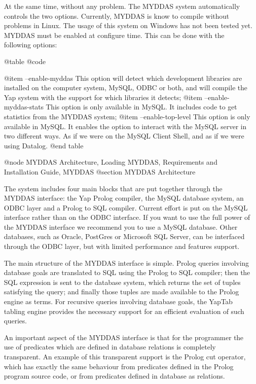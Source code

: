 {{{{{{{{{At the same time, without any problem. The MYDDAS system automatically
controls the two options. Currently, MYDDAS is know to compile without
problems in Linux. The usage of this system on Windows has not been
tested yet.  MYDDAS must be enabled at configure time. This can be done
with the following options: 

@table @code

@item --enable-myddas
 This option will detect which development libraries are installed on the computer system, MySQL, ODBC or both, and will compile the Yap system with the support for which libraries it detects;
@item  --enable-myddas-stats
This option is only available in MySQL. It includes code to get
statistics from the MYDDAS system;
@item  --enable-top-level
This option is only available in MySQL.  It enables the option to interact with the MySQL server in
two different ways. As if we were on the MySQL Client Shell, and as if
we were using Datalog. 
@end table

@node MYDDAS Architecture, Loading MYDDAS, Requirements and Installation Guide, MYDDAS
@section MYDDAS Architecture

The system includes four main blocks that are put together through the
MYDDAS interface: the Yap Prolog compiler, the MySQL database system, an
ODBC layer and a Prolog to SQL compiler. Current effort is put on the
MySQL interface rather than on the ODBC interface. If you want to use
the full power of the MYDDAS interface we recommend you to use a MySQL
database. Other databases, such as Oracle, PostGres or Microsoft SQL
Server, can be interfaced through the ODBC layer, but with limited
performance and features support.  

The main structure of the MYDDAS interface is simple. Prolog queries
involving database goals are translated to SQL using the Prolog to SQL
compiler; then the SQL expression is sent to the database system, which
returns the set of tuples satisfying the query; and finally those tuples
are made available to the Prolog engine as terms. For recursive queries
involving database goals, the YapTab tabling engine provides the
necessary support for an efficient evaluation of such queries.

An important aspect of the MYDDAS interface is that for the programmer
the use of predicates which are defined in database relations is
completely transparent. An example of this transparent support is the
Prolog cut operator, which has exactly the same behaviour from
predicates defined in the Prolog program source code, or from predicates
defined in database as relations.

}}}}}}}}}
